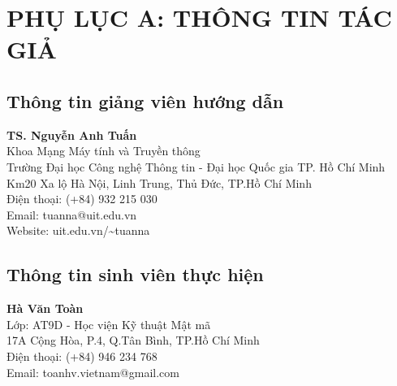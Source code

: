 \chapter*{PHỤ LỤC A: THÔNG TIN TÁC GIẢ}

\renewcommand{\baselinestretch}{1.5}
\section*{Thông tin giảng viên hướng dẫn}

\noindent \textbf{TS. Nguyễn Anh Tuấn}\\
\noindent Khoa Mạng Máy tính và Truyền thông\\
\noindent Trường Đại học Công nghệ Thông tin - Đại học Quốc gia TP. Hồ Chí Minh\\
\noindent Km20 Xa lộ Hà Nội, Linh Trung, Thủ Đức, TP.Hồ Chí Minh\\
\noindent Điện thoại: (+84) 932 215 030\\
\noindent Email: tuanna@uit.edu.vn\\
\noindent Website: uit.edu.vn/\textasciitilde tuanna\\

\section*{Thông tin sinh viên thực hiện}

\noindent \textbf{Hà Văn Toàn}\\
\noindent Lớp: AT9D - Học viện Kỹ thuật Mật mã\\
\noindent 17A Cộng Hòa, P.4, Q.Tân Bình, TP.Hồ Chí Minh\\
\noindent Điện thoại: (+84) 946 234 768\\
\noindent Email: toanhv.vietnam@gmail.com\\

